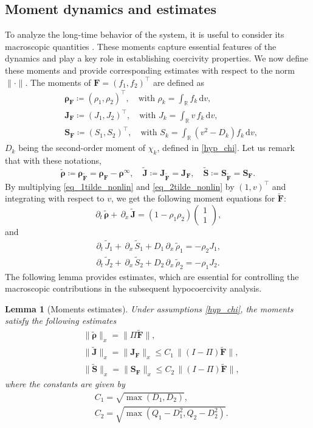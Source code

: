 \documentclass[reqno]{amsart}
\newtheorem{Lemma}{Lemma}
\newcommand{\dt}{\,\partial_t\, }
\newcommand{\dx}{\,\partial_x\, }
\newcommand{\dd}{\,\mathrm{d}}
\newcommand{\R}{\mathbb{R}}
\newcommand{\Ft}{{\widetilde{F}}}
\newcommand{\rhot}{\widetilde{\rho}}
\newcommand{\Jt}{\widetilde{J}}
\newcommand{\St}{\widetilde{S}}
\newcommand{\Ftbf}{\mathbf{\Ft}}
\newcommand{\Fbf}{\mathbf{F}}
\newcommand{\Jbf}{\mathbf{J}}
\newcommand{\Sbf}{\mathbf{S}}
\newcommand{\rhobf}{\boldsymbol{\rho}}
\newcommand{\rhotbf}{\boldsymbol{\rhot}}
\newcommand{\Jtbf}{\mathbf{\Jt}}
\newcommand{\Stbf}{\mathbf{\St}}
\numberwithin{equation}{section}
\begin{document}
\subsection{Moment dynamics and estimates}
To analyze the long-time behavior of the system, it is useful to consider its macroscopic quantities \cite{DolbeaultMouhotSchmeiser2015}. These moments capture essential features of the dynamics and play a key role in establishing coercivity properties. We now define these moments and provide corresponding estimates with respect to the norm $\|\cdot\|$. The moments of $\Fbf=\left(f_1, f_2\right)^\top$ are defined as
\begin{align}
 &   \rhobf_\Fbf\coloneq (\rho_1,\rho_2)^\top,\quad \text{with } \rho_k=\int_\R f_k\dd v, \label{def.rhoF}\\
 &   \Jbf_\Fbf\coloneq (J_1,J_2)^\top,\quad \text{with } J_k=\int_\R v\,f_k\dd v, \label{def.JF}\\
 &   \Sbf_\Fbf\coloneq (S_1,S_2)^\top,\quad \text{with } S_k=\int_\R (v^2-D_k)f_k\dd v, \label{def.SF}
\end{align}
$D_k$ being the second-order moment of $\chi_k$, defined in \eqref{hyp_chi}. Let us remark that with these notations,
\[ 
\rhotbf\coloneq\rhobf_\Ftbf=\rhobf_\Fbf-\rhobf^\infty,\quad \Jtbf\coloneq\Jbf_\Ftbf=\Jbf_\Fbf,\quad \Stbf\coloneq\Sbf_\Ftbf=\Sbf_\Fbf.
\]
By multiplying \eqref{eq_1tilde_nonlin} and \eqref{eq_2tilde_nonlin} by $(1,v)^\top$ and integrating with respect to $v$, we get the following moment equations for $\Ftbf$:
\begin{equation}\label{eq.rhoFt}
    \dt \rhotbf+\dx \Jtbf=(1-\rho_1\rho_2)\left(\begin{matrix}1\\ 1\end{matrix}\right),
\end{equation}
and 
\begin{align}
    \dt \Jt_1+\dx \St_1+D_1\dx \rhot_1=-\rho_2J_1,\label{eq.Jt1}\\
    \dt \Jt_2+\dx \St_2+D_2\dx \rhot_2=-\rho_1J_2. \label{eq.Jt2}
\end{align}
The following lemma provides estimates, which are essential for controlling the macroscopic contributions in the subsequent hypocoercivity analysis.

\begin{Lemma}[Moments estimates]
\label{lem_mom_estim}
Under assumptions \eqref{hyp_chi}, the moments satisfy the following estimates
\begin{align}
    & \|\rhotbf\|_x=\|\Pi \Ftbf\|, \label{estim.rhoFt}\\
    & \|\Jtbf\|_x=\|\Jbf_\Fbf\|_x\leq C_1 \,\|(I-\Pi)\Ftbf\|, \label{estim.JFt}\\
    & \|\Stbf\|_x=\|\Sbf_\Fbf\|_x\leq C_2 \,\|(I-\Pi)\Ftbf\|, \label{estim.SFt}
\end{align}
where the constants are given by
\begin{align}
    & C_1 = \sqrt{\max(D_1,D_2)}, \label{def.C1}\\
    & C_2 = \sqrt{\max(Q_1-D_1^2,Q_2-D_2^2)}. \label{def.C2}
\end{align}
\end{Lemma}
\end{document}

